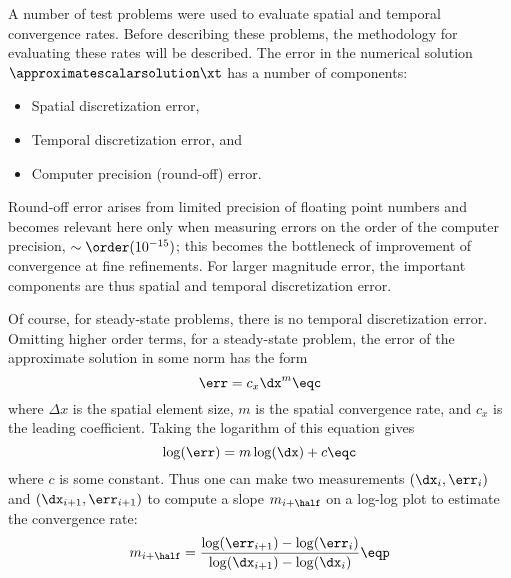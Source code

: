 A number of test problems were used to evaluate spatial and temporal
convergence rates. Before describing these problems, the methodology for
evaluating these rates will be described. The error in the numerical solution
$\approximatescalarsolution\xt$ has a number of components:
\begin{itemize}
  \item Spatial discretization error,
  \item Temporal discretization error, and
  \item Computer precision (round-off) error.
\end{itemize}
Round-off error arises from limited precision of floating point numbers and
becomes relevant here only when measuring errors on the order of the computer
precision, $\sim\order(10^{-15})$; this becomes the bottleneck of improvement
of convergence at fine refinements. For larger magnitude error, the important
components are thus spatial and temporal discretization error.

Of course, for steady-state problems, there is no temporal discretization
error. Omitting higher order terms, for a steady-state problem, the error of the
approximate solution in some norm has the form
\begin{equation}
  \err = c_{x}\dx^m \eqc
\end{equation}
where $\Delta x$ is the spatial element size, $m$ is the spatial convergence
rate, and $c_{x}$ is the leading coefficient. Taking the logarithm of
this equation gives
\begin{equation}
  \log(\err) = m\log(\dx) + c \eqc
\end{equation}
where $c$ is some constant. Thus one can make two measurements $(\dx_i,\err_i)$
and $(\dx_{i+1},\err_{i+1})$ to compute a slope $m_{i+\half}$ on a log-log
plot to estimate the convergence rate:
\begin{equation}\label{eq:convrate}
  m_{i+\half} = \frac{\log(\err_{i+1}) - \log(\err_i)}
    {\log(\dx_{i+1}) - \log(\dx_i)}
  \eqp
\end{equation}

